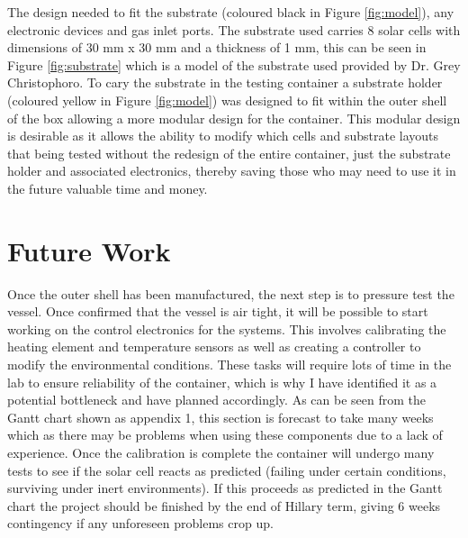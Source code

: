 \documentclass[a4paper,11pt]{article}
\begin{document}
\noindent The design needed to fit the substrate (coloured black in Figure \ref{fig:model}), any electronic devices and gas inlet ports. The substrate used carries 8 solar cells with dimensions of 30 mm x 30 mm and a thickness of 1 mm, this can be seen in Figure \ref{fig:substrate} which is a model of the substrate used provided by Dr. Grey Christophoro. To cary the substrate in the testing container a substrate holder (coloured yellow in Figure \ref{fig:model}) was designed to fit within the outer shell of the box allowing a more modular design for the container. This modular design is desirable as it allows the ability to modify which cells and substrate layouts that being tested without the redesign of the entire container, just the substrate holder and associated electronics, thereby saving those who may need to use it in the future valuable time and money. 
\section{Future Work}
Once the outer shell has been manufactured, the next step is to pressure test the vessel. Once confirmed that the vessel is air tight, it will be possible to start working on the control electronics for the systems. This involves calibrating the heating element and temperature sensors as well as creating a controller to modify the environmental conditions. These tasks will require lots of time in the lab to ensure reliability of the container, which is why I have identified it as a potential bottleneck and have planned accordingly. As can be seen from the Gantt chart shown as appendix 1, this section is forecast to take many weeks which as there may be problems when using these components due to a lack of experience. Once the calibration is complete the container will undergo many tests to see if the solar cell reacts as predicted (failing under certain conditions, surviving under inert environments). If this proceeds as predicted in the Gantt chart the project should be finished by the end of Hillary term, giving 6 weeks contingency if any unforeseen problems crop up. 
\begin{singlespace}


\end{singlespace}
\end{document}
